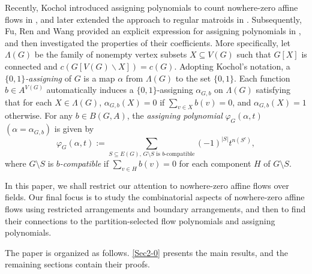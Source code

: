 \documentclass[12pt]{article}%
\renewcommand*{\bm}[1]{#1}%
\numberwithin{equation}{section}
\begin{document}
Recently, Kochol introduced assigning polynomials to count nowhere-zero affine flows in \cite{Kochol2022}, and later extended the approach to regular matroids in \cite{Kochol2024}. Subsequently, Fu, Ren and Wang  provided an explicit expression for assigning polynomials in \cite[Theorem 1.3]{FRW2025}, and then investigated the  properties of their coefficients. More specifically, let $\Lambda(G)$ be the family of nonempty vertex subsets $X\subseteq V(G)$ such that $G[X]$ is connected and $c(G[V(G)\smallsetminus X])=c(G)$. Adopting Kochol's notation, a {\em $\{0,1\}$-assigning} of $G$ is a map $\alpha$ from $\Lambda(G)$ to the set $\{0,1\}$. Each function  $\bm b\in A^{V(G)}$ automatically induces a $\{0,1\}$-assigning  $\alpha_{G,\bm b}$ on $\Lambda(G)$ satisfying that for each $X\in\Lambda(G)$,  $\alpha_{G,\bm b}(X)=0$ if $\sum_{v\in X}\bm b(v)=0$, and $\alpha_{G,\bm b}(X)=1$ otherwise. For any $\bm b\in B(G,A)$, the {\em assigning polynomial} $\varphi_G(\alpha,t)$ $(\alpha=\alpha_{G,\bm b})$ is given by
\begin{equation}\label{AP}
\varphi_G(\alpha,t):=\sum_{S\subseteq E(G),\,G\setminus S\text{ is $\bm b$-compatible}}(-1)^{|S|}t^{n(S^c)},
\end{equation}
where $G\setminus S$ is {\em $\bm b$-compatible} if $\sum_{v\in H}\bm b(v)=0$ for each component $H$ of $G\setminus S$. 

In this paper, we shall restrict our attention to nowhere-zero affine flows over fields. Our final focus is to study the combinatorial aspects of nowhere-zero affine flows using restricted arrangements and boundary arrangements, and then to find their connections to the partition-selected flow polynomials and assigning polynomials. 

The paper is organized as follows. \autoref{Sec2-0} presents the main results, and the remaining sections contain their proofs.
\end{document}
